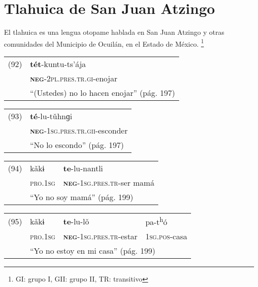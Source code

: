 \section*{Tlahuica de San Juan Atzingo}

\noindent El tlahuica es una lengua otopame hablada en San Juan Atzingo y otras comunidades del Municipio de Ocuilán, en el Estado de México.
\footnote{GI: grupo I, GII: grupo II, TR: transitivo}


\vspace{0.5cm}

{\setmainfont{Charis SIL} 

\begin{tabular}{ll}
(92) & \textbf{tét}-kuntu-ts’ája \\
& \textsc{\textbf{neg}-2pl.pres.tr.gi}-enojar \\
& ``(Ustedes) no lo hacen enojar'' (pág. 197)
\end{tabular} \vspace{0.3cm}

\begin{tabular}{ll}
(93) & \textbf{té}-lu-tǔhnɡi \\
& \textsc{\textbf{neg}-1sg.pres.tr.gii}-esconder \\
& ``No lo escondo'' (pág. 197)
\end{tabular} \vspace{0.3cm}

\begin{tabular}{lll}
(94) & kǎkɨ & \textbf{te}-lu-nantli \\
& \textsc{pro.1sg} & \textsc{\textbf{neg}-1sg.pres.tr}-ser mamá\\
& \multicolumn{2}{l}{``Yo no soy mamá'' (pág. 199)}
\end{tabular} \vspace{0.3cm}

\begin{tabular}{llll}
(95) & kǎkɨ & \textbf{te}-lu-lǒ & pa-t\textsuperscript{h}ó \\
& \textsc{pro.1sg} & \textsc{\textbf{neg}-1sg.pres.tr}-estar & \textsc{1sg.pos}-casa \\
& \multicolumn{3}{l}{``Yo no estoy en mi casa'' (pág. 199)}
\end{tabular} \vspace{0.3cm}

}
